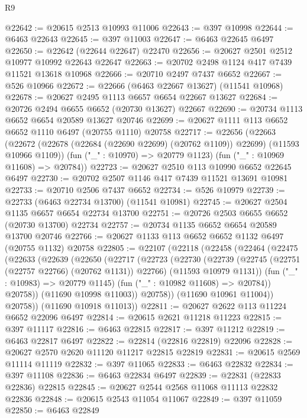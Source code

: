 \begin{lexlean}{R9}
\begin{coremodule}
{{{{{{{{{{{{{{{{{{{{{{{{{{{{{{{{{{{{{{{{{{{{{{{{{{{{{{{{{{{{{{{{{{{{{{{{{{{{{{{{{{{{@22642 := @20615 @2513 @10993 @11006
@22643 := @397 @10998
@22644 := @6463 @22643
@22645 := @397 @11003
@22647 := @6463 @22645 @6497
@22650 := @22642 (@22644 @22647) @22470
@22656 := @20627 @2501 @2512 @10977 @10992 @22643 @22647
@22663 := @20702 @2498 @1124 @417 @7439 @11521 @13618 @10968
@22666 := @20710 @2497 @7437 @6652
@22667 := @526 @10966
@22672 := @22666 (@6463 @22667 @13627) (@11541 @10968)
@22678 := @20627 @2495 @1113 @6657 @6654 @22667 @13627
@22684 := @20726 @2494 @6655 @6652 (@20730 @13627) @22667
@22690 := @20734 @1113 @6652 @6654 @20589 @13627 @20746
@22699 := @20627 @1111 @113 @6652 @6652 @1110 @6497 (@20755 @1110) @20758
@22717 := @22656
    (@22663
      (@22672 (@22678 (@22684 (@22690 @22699) (@20762 @1109)) @22699) (@11593 @10966 @1109))
      (fun ("_" : @10970) => @20779 @1123)
      (fun ("_" : @10969 @11608) => @20784))
@22723 := @20627 @2510 @113 @10990 @6652 @22645 @6497
@22730 := @20702 @2507 @1146 @417 @7439 @11521 @13691 @10981
@22733 := @20710 @2506 @7437 @6652
@22734 := @526 @10979
@22739 := @22733 (@6463 @22734 @13700) (@11541 @10981)
@22745 := @20627 @2504 @1135 @6657 @6654 @22734 @13700
@22751 := @20726 @2503 @6655 @6652 (@20730 @13700) @22734
@22757 := @20734 @1135 @6652 @6654 @20589 @13700 @20746
@22766 := @20627 @1133 @113 @6652 @6652 @1132 @6497 (@20755 @1132) @20758
@22805 := @22107
    (@22118
      (@22458
        (@22464
          (@22475
            (@22633
              (@22639
                (@22650
                  (@22717
                    (@22723
                      (@22730
                        (@22739
                          (@22745 (@22751 (@22757 @22766) (@20762 @1131)) @22766)
                          (@11593 @10979 @1131))
                        (fun ("_" : @10983) => @20779 @1145)
                        (fun ("_" : @10982 @11608) => @20784))
                      @20758))
                  (@11690 @10998 @11003))
                @20758))
            (@11690 @10961 @11004))
          @20758))
      (@11690 @10918 @11013))
@22811 := @20627 @2622 @113 @11224 @6652 @22096 @6497
@22814 := @20615 @2621 @11218 @11223
@22815 := @397 @11117
@22816 := @6463 @22815
@22817 := @397 @11212
@22819 := @6463 @22817 @6497
@22822 := @22814 (@22816 @22819) @22096
@22828 := @20627 @2570 @2620 @11120 @11217 @22815 @22819
@22831 := @20615 @2569 @11114 @11119
@22832 := @397 @11065
@22833 := @6463 @22832
@22834 := @397 @11108
@22836 := @6463 @22834 @6497
@22839 := @22831 (@22833 @22836) @22815
@22845 := @20627 @2544 @2568 @11068 @11113 @22832 @22836
@22848 := @20615 @2543 @11054 @11067
@22849 := @397 @11059
@22850 := @6463 @22849
}}}}}}}}}}}}}}}}}}}}}}}}}}}}}}}}}}}}}}}}}}}}}}}}}}}}}}}}}}}}}}}}}}}}}}}}}}}}}}}}}}}}
\end{coremodule}
\end{lexlean}
